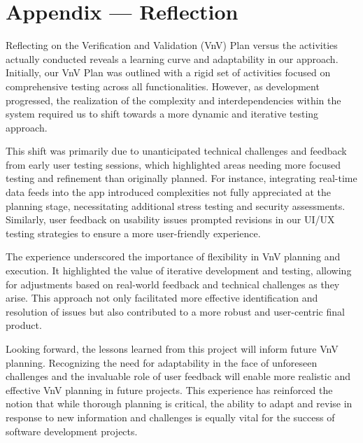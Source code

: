 \documentclass[12pt, titlepage]{article}
\begin{document}
\newpage{}
\section*{Appendix --- Reflection}

Reflecting on the Verification and Validation (VnV) Plan versus the activities actually conducted reveals a learning curve and adaptability in our approach. Initially, our VnV Plan was outlined with a rigid set of activities focused on comprehensive testing across all functionalities. However, as development progressed, the realization of the complexity and interdependencies within the system required us to shift towards a more dynamic and iterative testing approach.

This shift was primarily due to unanticipated technical challenges and feedback from early user testing sessions, which highlighted areas needing more focused testing and refinement than originally planned. For instance, integrating real-time data feeds into the app introduced complexities not fully appreciated at the planning stage, necessitating additional stress testing and security assessments. Similarly, user feedback on usability issues prompted revisions in our UI/UX testing strategies to ensure a more user-friendly experience.

The experience underscored the importance of flexibility in VnV planning and execution. It highlighted the value of iterative development and testing, allowing for adjustments based on real-world feedback and technical challenges as they arise. This approach not only facilitated more effective identification and resolution of issues but also contributed to a more robust and user-centric final product.

Looking forward, the lessons learned from this project will inform future VnV planning. Recognizing the need for adaptability in the face of unforeseen challenges and the invaluable role of user feedback will enable more realistic and effective VnV planning in future projects. This experience has reinforced the notion that while thorough planning is critical, the ability to adapt and revise in response to new information and challenges is equally vital for the success of software development projects.
\end{document}
